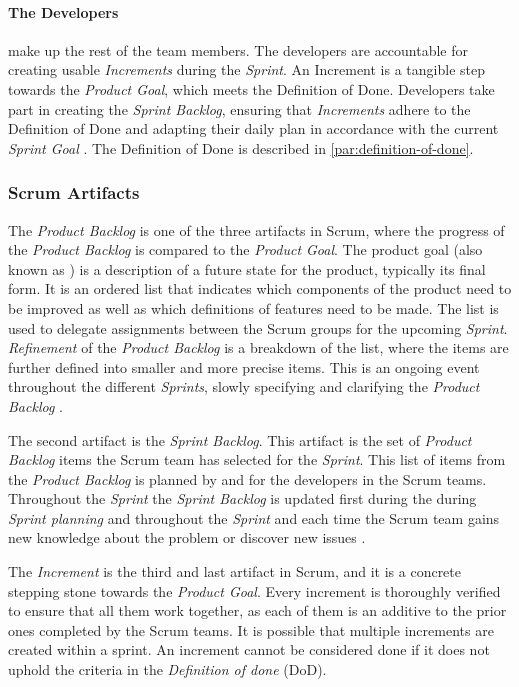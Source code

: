 \paragraph{The Developers}
make up the rest of the team members.
The developers are accountable for creating usable \emph{Increments} during the \emph{Sprint}. 
An Increment is a tangible step towards the \emph{Product Goal}, which meets the Definition of Done. 
Developers take part in creating the \emph{Sprint Backlog}, ensuring that \emph{Increments} adhere to the Definition of Done and adapting their daily plan in accordance with the current \emph{Sprint Goal} \cite{schwaber_sutherland_2022}.
The Definition of Done is described in \autoref{par:definition-of-done}.

\subsubsection{Scrum Artifacts}
The \emph{Product Backlog} is one of the three artifacts in Scrum, where the progress of the \emph{Product Backlog} is compared to the \emph{Product Goal}.
The product goal (also known as ) is a description of a future state for the product, typically its final form.
It is an ordered list that indicates which components of the product need to be improved as well as which definitions of features need to be made.
The list is used to delegate assignments between the Scrum groups for the upcoming \emph{Sprint}.
\emph{Refinement} of the \emph{Product Backlog} is a breakdown of the list, where the items are further defined into smaller and more precise items.
This is an ongoing event throughout the different \emph{Sprints}, slowly specifying and clarifying the \emph{Product Backlog} \cite{schwaber_sutherland_2022}. 

The second artifact is the \emph{Sprint Backlog}. 
This artifact is the set of \emph{Product Backlog} items the Scrum team has selected for the \emph{Sprint}. 
This list of items from the \emph{Product Backlog} is planned by and for the developers in the Scrum teams. 
Throughout the \emph{Sprint} the \emph{Sprint Backlog} is updated first during the during \emph{Sprint planning} and throughout the \emph{Sprint} and each time the Scrum team gains new knowledge about the problem or discover new issues \cite{schwaber_sutherland_2022}. 

The \emph{Increment} is the third and last artifact in Scrum, and it is a concrete stepping stone towards the \emph{Product Goal}.
Every increment is thoroughly verified to ensure that all them work together, as each of them is an additive to the prior ones completed by the Scrum teams.
It is possible that multiple increments are created within a sprint.
An increment cannot be considered done if it does not uphold the criteria in the \emph{Definition of done} (DoD)\cite{schwaber_sutherland_2022}.

